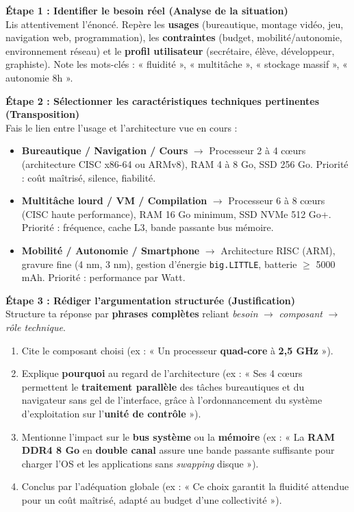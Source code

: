 \documentclass[11pt]{article}
\newcommand{\cle}[1]{{\popxbold\color{popdark}#1}}
\begin{document}
\begin{methode}
\textbf{Étape 1 : Identifier le besoin réel (Analyse de la situation)} \\
Lis attentivement l'énoncé. Repère les \textbf{usages} (bureautique, montage vidéo, jeu, navigation web, programmation), les \textbf{contraintes} (budget, mobilité/autonomie, environnement réseau) et le \textbf{profil utilisateur} (secrétaire, élève, développeur, graphiste). Note les mots-clés : « fluidité », « multitâche », « stockage massif », « autonomie 8h ».

\textbf{Étape 2 : Sélectionner les caractéristiques techniques pertinentes (Transposition)} \\
Fais le lien entre l'usage et l'architecture vue en cours :
\begin{itemize}
    \item \textbf{Bureautique / Navigation / Cours} $\rightarrow$ Processeur 2 à 4 cœurs (architecture CISC x86-64 ou ARMv8), RAM 4 à 8 Go, SSD 256 Go. Priorité : coût maîtrisé, silence, fiabilité.
    \item \textbf{Multitâche lourd / VM / Compilation} $\rightarrow$ Processeur 6 à 8 cœurs (CISC haute performance), RAM 16 Go minimum, SSD NVMe 512 Go+. Priorité : fréquence, cache L3, bande passante bus mémoire.
    \item \textbf{Mobilité / Autonomie / Smartphone} $\rightarrow$ Architecture \cle{RISC} (ARM), gravure fine (4 nm, 3 nm), gestion d'énergie \texttt{big.LITTLE}, batterie $\ge$ 5000 mAh. Priorité : performance par Watt.
\end{itemize}

\textbf{Étape 3 : Rédiger l'argumentation structurée (Justification)} \\
Structure ta réponse par \textbf{phrases complètes} reliant \emph{besoin} $\rightarrow$ \emph{composant} $\rightarrow$ \emph{rôle technique}.
\begin{enumerate}
    \item Cite le composant choisi (ex : « Un processeur \textbf{quad-core} à \textbf{2,5 GHz} »).
    \item Explique \textbf{pourquoi} au regard de l'architecture (ex : « Ses 4 cœurs permettent le \textbf{traitement parallèle} des tâches bureautiques et du navigateur sans gel de l'interface, grâce à l'ordonnancement du système d'exploitation sur l'\textbf{unité de contrôle} »).
    \item Mentionne l'impact sur le \textbf{bus système} ou la \textbf{mémoire} (ex : « La \textbf{RAM DDR4 8 Go} en \textbf{double canal} assure une bande passante suffisante pour charger l'OS et les applications sans \emph{swapping} disque »).
    \item Conclus par l'adéquation globale (ex : « Ce choix garantit la fluidité attendue pour un coût maîtrisé, adapté au budget d'une collectivité »).
\end{enumerate}
\end{methode}
\end{document}
